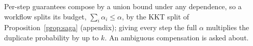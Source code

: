  Per-step guarantees compose by a union bound under any dependence, so a workflow splits its budget, $\sum_i\alpha_i\le\alpha$, by the KKT
split of Proposition~\ref{prop:saga} (appendix); giving every step the full $\alpha$ multiplies the duplicate probability by up to $k$. An ambiguous compensation is asked about.
